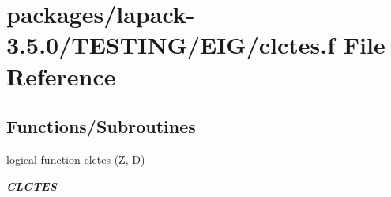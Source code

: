 \hypertarget{clctes_8f}{}\section{packages/lapack-\/3.5.0/\+T\+E\+S\+T\+I\+N\+G/\+E\+I\+G/clctes.f File Reference}
\label{clctes_8f}
\subsection*{Functions/\+Subroutines}
\begin{DoxyCompactItemize}
\item 
\hyperlink{tnc_8c_aa7b64cdf39500931f7b333343791a104}{logical} \hyperlink{afunc_8m_a7b5e596df91eadea6c537c0825e894a7}{function} \hyperlink{group__complex__eig_ga90c4512d4a10ff8cc0050e0aaa112b5f}{clctes} (Z, \hyperlink{odrpack_8h_a7dae6ea403d00f3687f24a874e67d139}{D})
\begin{DoxyCompactList}\small\item\em {\bfseries C\+L\+C\+T\+E\+S} \end{DoxyCompactList}\end{DoxyCompactItemize}
